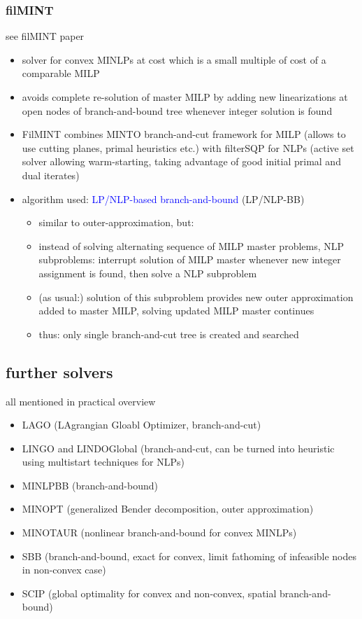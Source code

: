 \documentclass{article}
\begin{document}
\subsubsection{filMINT}
\label{sec:filmint}
see filMINT paper \cite{abhishek2010filmint}
\begin{itemize}
\item solver for convex MINLPs at cost which is a small multiple of cost of a comparable MILP
\item avoids complete re-solution of master MILP by adding new linearizations at open nodes of branch-and-bound tree whenever integer solution is found
\item FilMINT combines MINTO branch-and-cut framework for MILP (allows to use cutting planes, primal heuristics etc.)  with filterSQP for NLPs (active set solver allowing warm-starting, taking advantage of good initial primal and dual iterates)
\item algorithm used: \textcolor{blue}{LP/NLP-based branch-and-bound} (LP/NLP-BB) \cite{quesada1992lp}
\begin{itemize}
\item similar to outer-approximation, but:
\item instead of solving alternating sequence of MILP master problems, NLP subproblems: interrupt solution of MILP master whenever new integer assignment is found, then solve a NLP subproblem
\item (as usual:) solution of this subproblem provides new outer approximation added to master MILP, solving updated MILP master continues
\item thus: only single branch-and-cut tree is created and searched
\end{itemize}
\end{itemize}

\subsection{further solvers}
all mentioned in practical overview \cite{d2013mixed}
\begin{itemize}
\item LAGO (LAgrangian Gloabl Optimizer, branch-and-cut)
\item LINGO and LINDOGlobal (branch-and-cut, can be turned into heuristic using multistart techniques for NLPs)
\item MINLPBB (branch-and-bound)
\item MINOPT (generalized Bender decomposition, outer approximation)
\item MINOTAUR (nonlinear branch-and-bound for convex MINLPs)
\item SBB (branch-and-bound, exact for convex, limit fathoming of infeasible nodes in non-convex case)
\item SCIP (global optimality for convex and non-convex, spatial branch-and-bound)
\end{itemize}
\end{document}
